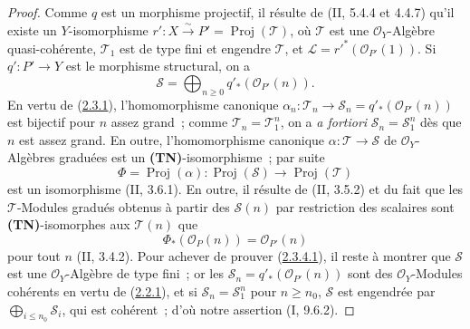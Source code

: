 \begin{proof}
Comme $q$ est un morphisme projectif, il résulte de (II, 5.4.4 et 4.4.7)
qu'il existe un $Y$-isomorphisme
$r':X\xrightarrow{\sim}P'=\operatorname{Proj}(\mathcal T)$, où
$\mathcal T$ est une $\mathcal O_Y$-Algèbre quasi-cohérente,
$\mathcal T_1$ est de type fini et engendre $\mathcal T$, et
$\mathcal L=r'^*(\mathcal O_{P'}(1))$. Si $q':P'\to Y$ est le morphisme
structural, on a
\[
\mathcal S=\bigoplus_{n\geq0}q'_*(\mathcal O_{P'}(n)).
\]
En vertu de (\hyperref[III.2.3.1-fr]{2.3.1}), l'homomorphisme canonique
$\alpha_n:\mathcal T_n\to\mathcal S_n=q'_*(\mathcal O_{P'}(n))$ est
bijectif pour $n$ assez grand~; comme $\mathcal T_n=\mathcal T_1^n$, on a
\emph{a fortiori} $\mathcal S_n=\mathcal S_1^n$ dès que $n$ est assez
grand. En outre, l'homomorphisme canonique
$\alpha:\mathcal T\to\mathcal S$ de $\mathcal O_Y$-Algèbres graduées est
un \textbf{(TN)}-isomorphisme~; par suite
\label{III.2.3.5.1-fr}
\[
\Phi=\operatorname{Proj}(\alpha):
\operatorname{Proj}(\mathcal S)\longrightarrow
\operatorname{Proj}(\mathcal T)
\]
est un isomorphisme (II, 3.6.1). En outre, il résulte de (II, 3.5.2) et
du fait que les $\mathcal T$-Modules gradués obtenus à partir des
$\mathcal S(n)$ par restriction des scalaires sont \textbf{(TN)}-isomorphes
aux $\mathcal T(n)$ que
\[
\Phi_*(\mathcal O_P(n))=\mathcal O_{P'}(n)
\]
pour tout $n$ (II, 3.4.2). Pour achever de prouver
(\hyperref[III.2.3.4.1-fr]{2.3.4.1}), il reste à montrer que $\mathcal S$
est une $\mathcal O_Y$-Algèbre de type fini~; or les
$\mathcal S_n=q'_*(\mathcal O_{P'}(n))$ sont des
$\mathcal O_Y$-Modules cohérents en vertu de
(\hyperref[III.2.2.1-fr]{2.2.1}), et si
$\mathcal S_n=\mathcal S_1^n$ pour $n\geq n_0$, $\mathcal S$ est
engendrée par $\bigoplus_{i\leq n_0}\mathcal S_i$, qui est cohérent~;
d'où notre assertion (I, 9.6.2).


\end{proof}
